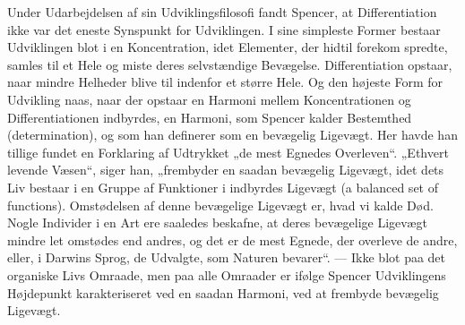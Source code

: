 \documentclass[12pt,a4paper,openany]{book}
\newcommand{\opage}[1]{\marginnote{\footnotesize\textit{[#1]}}}
\begin{document}
Under Udarbejdelsen af sin Udviklingsfilosofi fandt Spencer,
at Differentiation ikke var det eneste Synspunkt for Udviklingen.
I sine simpleste Former bestaar Udviklingen blot i en Koncentration,
idet Elementer, der hidtil forekom spredte, samles til
et Hele og miste deres selvstændige Bevægelse. Differentiation
opstaar, naar mindre Helheder blive til indenfor et større Hele.
Og den højeste Form for Udvikling naas, naar der opstaar en
\setcounter{footnote}{0}%
\opage{211}Harmoni mellem Koncentrationen og Differentiationen indbyrdes,
en Harmoni, som Spencer kalder Bestemthed (determination),
og som han definerer som en bevægelig Ligevægt. Her havde
han tillige fundet en Forklaring af Udtrykket „de mest Egnedes
Overleven“. „Ethvert levende Væsen“, siger han, „frembyder
en saadan bevægelig Ligevægt, idet dets Liv bestaar i en
Gruppe af Funktioner i indbyrdes Ligevægt (a balanced set of
functions). Omstødelsen af denne bevægelige Ligevægt er,
hvad vi kalde Død. Nogle Individer i en Art ere saaledes beskafne,
at deres bevægelige Ligevægt mindre let omstødes end
andres, og det er de mest Egnede, der overleve de andre,
eller, i Darwins Sprog, de Udvalgte, som Naturen bevarer“.
--- Ikke blot paa det organiske Livs Omraade, men paa alle Omraader
er ifølge Spencer Udviklingens Højdepunkt karakteriseret
ved en saadan Harmoni, ved at frembyde bevægelig Ligevægt.
\end{document}
